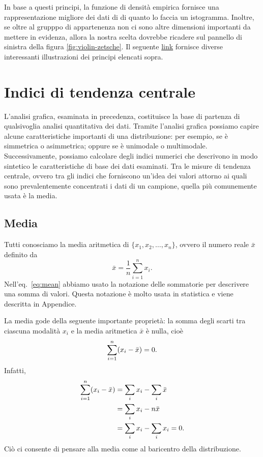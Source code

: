 \documentclass[
  10pt,
  italian,
  a4paper,
  extrafontsizes,onecolumn,openright
  ]{memoir}
\theoremstyle{definition}
\theoremstyle{definition}
\theoremstyle{definition}
\theoremstyle{definition}
\theoremstyle{remark}
\begin{document}
In base a questi principi, la funzione di densità empirica fornisce una
rappresentazione migliore dei dati di \textcite{zetschefuture2019} di quanto lo faccia un istogramma. Inoltre, se oltre al grupppo di appartenenza non ci sono altre dimensioni importanti da mettere in evidenza, allora la nostra scelta dovrebbe ricadere sul pannello di sinistra della figura \ref{fig:violin-zetsche}. Il seguente \href{https://www.biostat.wisc.edu/~kbroman/presentations/graphs2018.pdf}{link} fornisce diverse interessanti illustrazioni dei principi elencati sopra.

\hypertarget{indici-di-tendenza-centrale}{%
\section{Indici di tendenza centrale}\label{indici-di-tendenza-centrale}}

L'analisi grafica, esaminata in precedenza, costituisce la base di
partenza di qualsivoglia analisi quantitativa dei dati. Tramite
l'analisi grafica possiamo capire alcune caratteristiche importanti di
una distribuzione: per esempio, se è simmetrica o asimmetrica; oppure se
è unimodale o multimodale. Successivamente, possiamo calcolare degli
indici numerici che descrivono in modo sintetico le caratteristiche di
base dei dati esaminati. Tra le misure di tendenza centrale, ovvero tra
gli indici che forniscono un'idea dei valori attorno ai quali sono
prevalentemente concentrati i dati di un campione, quella più
comunemente usata è la media.

\hypertarget{media}{%
\subsection{Media}\label{media}}

Tutti conosciamo la media aritmetica di \(\{x_1, x_2, \dots, x_n\}\),
ovvero il numero reale \(\bar{x}\) definito da
\begin{equation}
\bar{x}=\frac{1}{n}\sum_{i=1}^n x_i.
\label{eq:mean}
\end{equation}
Nell'eq.~\eqref{eq:mean} abbiamo usato la notazione delle sommatorie
per descrivere una somma di valori. Questa notazione è molto usata in
statistica e viene descritta in Appendice.

La media gode della seguente importante proprietà: la somma degli scarti
tra ciascuna modalità \(x_i\) e la media aritmetica \(\bar{x}\) è nulla,
cioè
\[
\sum_{i=1}^n (x_i - \bar{x}) = 0.\notag
\label{eq:diffmeansumzero}\] Infatti, \[\begin{aligned}
\sum_{i=1}^n (x_i - \bar{x}) &= \sum_i x_i - \sum_i \bar{x}\notag\\
&= \sum_i x_i - n \bar{x}\notag\\
&= \sum_i x_i - \sum_i x_i = 0.\notag\end{aligned}
\]
Ciò ci consente di pensare alla media come al baricentro della distribuzione.
\end{document}
